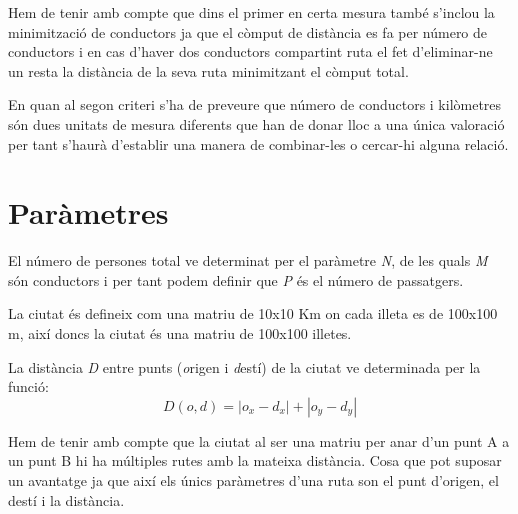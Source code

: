 Hem de tenir amb compte que dins el primer en certa mesura també s'inclou la minimització de conductors
ja que el còmput de distància es fa per número de conductors i en cas d'haver dos conductors compartint
ruta el fet d'eliminar-ne un resta la distància de la seva ruta minimitzant el còmput total.

En quan al segon criteri s'ha de preveure que número de conductors i kilòmetres són dues unitats de 
mesura diferents que han de donar lloc a una única valoració per tant s'haurà d'establir una manera 
de combinar-les o cercar-hi alguna relació.

\section{Paràmetres}

El número de persones total ve determinat per el paràmetre \emph{N}, de les quals \emph{M} són conductors i per
tant podem definir que \emph{P} és el número de passatgers. 

La ciutat és defineix com una matriu de 10x10 Km on cada illeta es de 100x100 m, així doncs
la ciutat és una matriu de 100x100 illetes.

La distància \emph{D} entre punts (\emph{o}rigen i \emph{d}estí) de la ciutat ve determinada per la funció:
$$ D(o,d) = |o_x - d_x| + |o_y - d_y| $$

Hem de tenir amb compte que la ciutat al ser una matriu per anar d'un punt A a un punt B hi ha múltiples
rutes amb la mateixa distància. Cosa que pot suposar un avantatge ja que així els únics paràmetres
d'una ruta son el punt d'origen, el destí i la distància.
